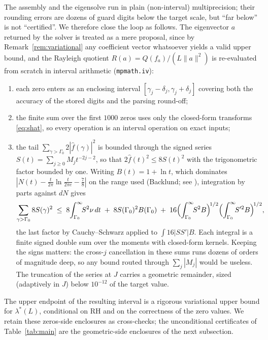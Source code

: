 ﻿\documentclass[11pt]{article}
\newcommand{\lmin}{\lambda^{*}}
\newcommand{\fhat}{\hat f}
\begin{document}
The assembly and the eigensolve run in plain (non-interval)
multiprecision; their rounding errors are dozens of guard digits below
the target scale, but ``far below'' is not ``certified''.  We
therefore close the loop as follows.  The eigenvector $a$ returned by
the solver is treated as a mere proposal, since by
Remark~\ref{rem:variational} any coefficient vector whatsoever yields a
valid upper bound, and the Rayleigh quotient
$R(a)=Q(f_a)/(L\|a\|^2)$ is re-evaluated from scratch in interval
arithmetic (\texttt{mpmath.iv}):

\begin{enumerate}
\item each zero enters as an enclosing interval
  $[\gamma_j-\delta_j,\gamma_j+\delta_j]$ covering both the accuracy
  of the stored digits and the parsing round-off;
\item the finite sum over the first $1000$ zeros uses only the
  closed-form transforms \eqref{eq:shat}, so every operation is an
  interval operation on exact inputs;
\item the tail $\sum_{\gamma>\Gamma_0}2|\fhat(\gamma)|^2$ is bounded
  through the signed series $S(t)=\sum_{j\ge0}M_j t^{-2j-2}$, so that
  $2\fhat(t)^{2}\le8S(t)^{2}$ with the trigonometric factor bounded by
  one.  Writing $B(t)=1+\ln t$, which dominates
  $|N(t)-\frac{t}{2\pi}\ln\frac{t}{2\pi e}-\frac78|$ on the range used
  (Backlund; see \cite[\S9.4]{Titchmarsh1986}), integration by parts
  against $dN$ gives
  \[
    \sum_{\gamma>\Gamma_0}8S(\gamma)^{2}
    \;\le\;8\!\int_{\Gamma_0}^{\infty}\!\!S^{2}\nu\,dt
    \;+\;8S(\Gamma_0)^{2}B(\Gamma_0)
    \;+\;16\Bigl(\int_{\Gamma_0}^{\infty}\!\!S^{2}B\Bigr)^{\!1/2}
    \Bigl(\int_{\Gamma_0}^{\infty}\!\!S'^{2}B\Bigr)^{\!1/2},
  \]
  the last factor by Cauchy--Schwarz applied to $\int16|SS'|B$.  Each
  integral is a finite signed double sum over the moments with
  closed-form kernels.  Keeping the signs matters: the cross-$j$
  cancellation in these sums runs dozens of orders of magnitude deep,
  so any bound routed through $\sum_j|M_j|$ would be useless.  The
  truncation of the series at $J$ carries a geometric remainder, sized
  (adaptively in $J$) below $10^{-12}$ of the target value.
\end{enumerate}

The upper endpoint of the resulting interval is a rigorous variational
upper bound for $\lmin(L)$, conditional on RH and on the correctness of
the zero values.  We retain these zeros-side enclosures as
cross-checks; the unconditional certificates of Table~\ref{tab:main}
are the geometric-side enclosures of the next subsection.
\end{document}
